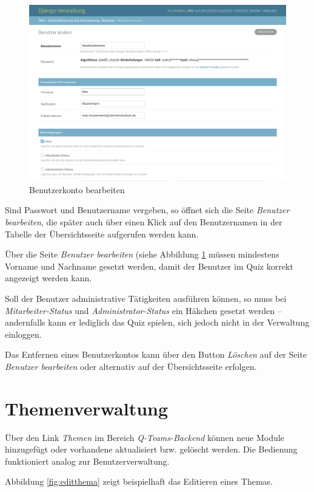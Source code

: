 \documentclass[a4paper,11pt,listof=numbered,glossary=totoc,parskip=half,toc=bib]{scrreprt}
\begin{document}
\begin{appendices}
	\begin{figure}
		\centering
		\includegraphics[width=\textwidth]{editbenutzer}
		\caption{Benutzerkonto bearbeiten}
		\label{fig:editbenutzer}
	\end{figure}
	
	Sind Passwort und Benutzername vergeben, so öffnet sich die Seite \textit{Benutzer bearbeiten}, die später auch über einen Klick auf den Benutzernamen in der Tabelle der Übersichtsseite aufgerufen werden kann.
	
	Über die Seite \textit{Benutzer bearbeiten} (siehe Abbildung \ref{fig:editbenutzer} müssen mindestens Vorname und Nachname gesetzt werden, damit der Benutzer im Quiz korrekt angezeigt werden kann.
	
	Soll der Benutzer administrative Tätigkeiten ausführen können, so muss bei \textit{Mitarbeiter-Status} und \textit{Administrator-Status} ein Häkchen gesetzt werden -- andernfalls kann er lediglich das Quiz spielen, sich jedoch nicht in der Verwaltung einloggen.
	
	Das Entfernen eines Benutzerkontos kann über den Button \textit{Löschen} auf der Seite \textit{Benutzer bearbeiten} oder alternativ auf der Übersichtsseite erfolgen.
	
	\section{Themenverwaltung}
	Über den Link \textit{Themen} im Bereich \textit{Q-Teams-Backend} können neue Module hinzugefügt oder vorhandene aktualisiert bzw. gelöscht werden. Die Bedienung funktioniert analog zur Benutzerverwaltung.
	
	Abbildung \ref{fig:editthema} zeigt beispielhaft das Editieren eines Themas.
	

\end{appendices}
\end{document}
